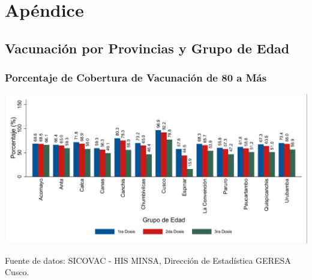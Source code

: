 \documentclass[xcolor=table]{beamer}
\begin{document}


\appendix
\section{Apéndice}

\subsection{Vacunación por Provincias y Grupo de Edad}

\begin{frame}[label=vacunas_90]
	\frametitle{Porcentaje de Cobertura de Vacunación de 80 a Más}
	\vspace{-.5cm}
	\begin{center}
		\includegraphics[width=1.0\linewidth, trim={.2cm .5cm .2cm .2cm},clip]{../figuras/vacunacion_provincial_edad_practica_9.pdf}
	\end{center}
	{\tiny Fuente de datos: SICOVAC - HIS MINSA, Dirección de Estadística GERESA Cusco. \\}
	\hyperlink{cobertura_vacuna_provincias}{}
\end{frame}
\end{document}
